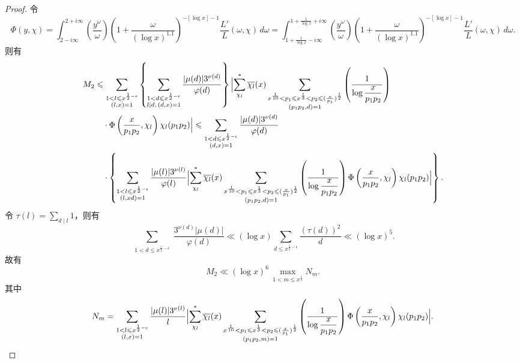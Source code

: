 \begin{proof}
令
\[
\Phi(y,\chi)=\int_{2-i\infty}^{2+i\infty}\left(\frac{y^\omega}{\omega}\right)\left(1+\frac{\omega}{(\log x)^{1.1}}\right)^{-[\log x]-1}\frac{L'}{L}(\omega,\chi)\,d\omega
=\int_{1+\frac1{\log x}-i\infty}^{1+\frac1{\log x}+i\infty}\left(\frac{y^\omega}{\omega}\right)\left(1+\frac{\omega}{(\log x)^{1.1}}\right)^{-[\log x]-1}\frac{L'}{L}(\omega,\chi)\,d\omega.
\]
则有
\begin{align*}
M_2&\leqslant\sum_{\substack{1<l\leqslant x^{\frac12-\epsilon}\\(l,x)=1}}\left\{\sum_{\substack{1<d\leqslant x^{\frac12-\epsilon}\\l\mid d,\,(d,x)=1}}\frac{|\mu(d)|3^{\nu(d)}}{\varphi(d)}\right\}
\Bigl|\sum_{\chi_l}^{*}\overline{\chi_l}(x)\sum_{\substack{x^{\frac1{10}}<p_1\leqslant x^{\frac13}<p_2\leqslant(\frac{x}{p_1})^{\frac12}\\(p_1p_2,d)=1}}\left(\frac1{\log\dfrac{x}{p_1p_2}}\right)\\
&\quad\cdot\Phi\left(\frac{x}{p_1p_2},\chi_l\right)\chi_l(p_1p_2)\Bigr|
\leqslant\sum_{\substack{1<d\leqslant x^{\frac12-\epsilon}\\(d,x)=1}}\frac{|\mu(d)|3^{\nu(d)}}{\varphi(d)}\\
&\quad\cdot\left\{\sum_{\substack{1<l\leqslant x^{\frac12-\epsilon}\\(l,xd)=1}}\frac{|\mu(l)|3^{\nu(l)}}{\varphi(l)}\Bigl|\sum_{\chi_l}^{*}\overline{\chi_l}(x)\sum_{\substack{x^{\frac1{10}}<p_1\leqslant x^{\frac13}<p_2\leqslant(\frac{x}{p_1})^{\frac12}\\(p_1p_2,d)=1}}\left(\frac1{\log\dfrac{x}{p_1p_2}}\right)\Phi\left(\frac{x}{p_1p_2},\chi_l\right)\chi_l(p_1p_2)\Bigr|\right\}.
\end{align*}
令 $\tau(l)=\displaystyle\sum_{d\mid l}1$，则有
\[
\sum_{\substack{1<d\leqslant x^{\frac12-\epsilon}}}\frac{3^{\nu(d)}|\mu(d)|}{\varphi(d)}\ll(\log x)\sum_{d\leqslant x^{\frac12-\epsilon}}\frac{(\tau(d))^2}{d}\ll(\log x)^5.
\]
故有
\begin{equation}\label{eq:chen12}
M_2\ll(\log x)^6\,\underset{1<m\leqslant x^{\frac12}}{\max}N_m.
\end{equation}
其中
\[
N_m=\sum_{\substack{1<l\leqslant x^{\frac12-\epsilon}\\(l,x)=1}}\frac{|\mu(l)|3^{\nu(l)}}{l}
\Bigl|\sum_{\chi_l}^{*}\overline{\chi_l}(x)\sum_{\substack{x^{\frac1{10}}<p_1\leqslant x^{\frac13}<p_2\leqslant(\frac{x}{p_1})^{\frac12}\\(p_1p_2,m)=1}}\left(\frac1{\log\dfrac{x}{p_1p_2}}\right)\Phi\left(\frac{x}{p_1p_2},\chi_l\right)\chi_l(p_1p_2)\Bigr|.
\]
\end{proof}
